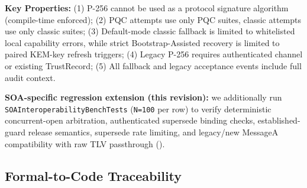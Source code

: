 \documentclass[10pt,journal,compsoc]{IEEEtran}
\begin{document}
\textbf{Key Properties:}
(1) P-256 cannot be used as a protocol signature algorithm (compile-time enforced);
(2) PQC attempts use only PQC suites, classic attempts use only classic suites;
(3) Default-mode classic fallback is limited to whitelisted local capability errors, while strict Bootstrap-Assisted recovery is limited to paired KEM-key refresh triggers;
(4) Legacy P-256 requires authenticated channel or existing TrustRecord;
(5) All fallback and legacy acceptance events include full audit context.

\textbf{SOA-specific regression extension (this revision):}
we additionally run \texttt{SOAInteroperabilityBenchTests}
(\texttt{N=100} per row) to verify deterministic concurrent-open
arbitration, authenticated supersede binding checks, established-guard
release semantics, supersede rate limiting, and legacy/new MessageA
compatibility with raw TLV passthrough
().

\subsection*{Formal-to-Code Traceability}
\end{document}
